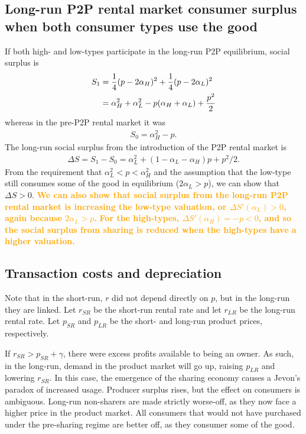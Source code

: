 \documentclass[11pt]{article}
\newcommand{\important}[1]{\textcolor{orange}{\textbf{#1}}}
\newcommand{\important}[1]{#1}
\begin{document}
\subsection{Long-run P2P rental market consumer surplus when both consumer types use the good} 
If both high- and low-types participate in the long-run P2P equilibrium, social surplus is 
\begin{align} 
S_1 & = \frac{1}{4}(p - 2\alpha_H)^2 + \frac{1}{4}(p - 2\alpha_L)^2 \notag \\
    & = \alpha_H^2 + \alpha_L^2 - p(\alpha_H + \alpha_L) + \frac{p^2}{2} \notag \\ 
\end{align} 
whereas in the pre-P2P rental market it was 
\begin{align}
S_0 = \alpha_H^2 - p.  
\end{align} 
The long-run social surplus from the introduction of the P2P rental market is  
\begin{align}
\Delta S = S_1 - S_0 = \alpha_L^2 + (1 - \alpha_L - \alpha_H)p + p^2/2.  
\end{align} 
From the requirement that $\alpha_L^2 < p < \alpha_H^2$ and the assumption that the low-type still consumes some of the good in equilibrium ($2 \alpha_L > p$), we can show that $\Delta S > 0$. 
\important{We can also show that social surplus from the long-run P2P rental market is increasing the low-type valuation, or $\Delta S'(\alpha_L) > 0$, again because $2\alpha_L > p$.}
\important{For the high-types, $\Delta S'(\alpha_H) = -p < 0$, and so the social surplus from sharing is 
reduced when the high-types have a higher valuation.}

\subsection{Transaction costs and depreciation}
Note that in the short-run, $r$ did not depend directly on $p$, but in the long-run they are linked. 
Let $r_{SR}$ be the short-run rental rate and let $r_{LR}$ be the long-run rental rate. 
Let $p_{SR}$ and $p_{LR}$ be the short- and long-run product prices, respectively.  

If $r_{SR} > p_{SR} + \gamma$, there were excess profits available to being an owner. 
As such, in the long-run, demand in the product market will go up, raising $p_{LR}$ and lowering $r_{SR}$. 
In this case, the emergence of the sharing economy causes a Jevon's paradox of increased usage. 
Producer surplus rises, but the effect on consumers is ambiguous. 
Long-run non-sharers are made strictly worse-off, as they now face a higher price in the product market. 
All consumers that would not have purchased under the pre-sharing regime are better off, as they consumer some of the good.
\end{document}
